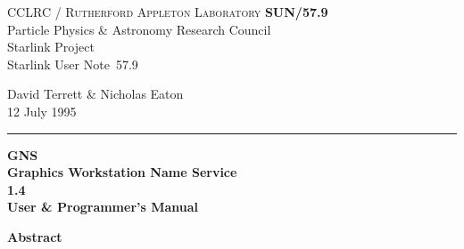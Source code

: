 \documentclass[twoside,11pt]{article}
\newcommand{\stardoccategory}  {Starlink User Note}
\newcommand{\stardocinitials}  {SUN}
\newcommand{\stardocnumber}    {57.9}
\newcommand{\stardocauthors}   {David Terrett \& Nicholas Eaton}
\newcommand{\stardocdate}      {12 July 1995}
\newcommand{\stardoctitle}     {GNS\\[\latex{2.5ex}] Graphics Workstation Name Service}
\newcommand{\stardocversion}   {1.4}
\newcommand{\stardocmanual}    {User \& Programmer's Manual}
\newcommand{\stardocname}{\stardocinitials /\stardocnumber}
\newenvironment{latexonly}{}{}
\newcommand{\latex}[1]{#1}
\renewcommand{\_}{\texttt{\symbol{95}}}
\begin{document}
\thispagestyle{empty}

\begin{latexonly}
   CCLRC / \textsc{Rutherford Appleton Laboratory} \hfill \textbf{\stardocname}\\
   {\large Particle Physics \& Astronomy Research Council}\\
   {\large Starlink Project\\}
   {\large \stardoccategory\ \stardocnumber}
   \begin{flushright}
   \stardocauthors\\
   \stardocdate
   \end{flushright}
   \vspace{-4mm}
   \rule{\textwidth}{0.5mm}
   \vspace{5mm}
   \begin{center}
   {\Huge\textbf{\stardoctitle \\ [2.5ex]}}
   {\LARGE\textbf{\stardocversion \\ [4ex]}}
   {\Huge\textbf{\stardocmanual}}
   \end{center}
   \vspace{5mm}


   \vspace{10mm}
   \begin{center}
      {\Large\textbf{Abstract}}
   \end{center}
\end{latexonly}
\end{document}
